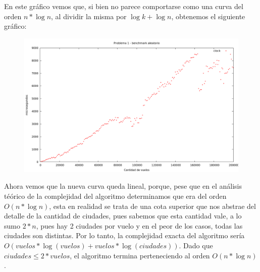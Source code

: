 \vspace*{0.5cm}

En este gráfico vemos que, si bien no parece comportarse como una curva del orden $n*\log n$, al dividir la misma por $\log k + \log n$, obtenemos el siguiente gráfico:

\vspace*{0.5cm}

\begin{figure}[h]
  \begin{center}
    \includegraphics[scale=0.35]{imagenes/grafico-1-v-ajustado.png}
  \end{center}
\end{figure}

\vspace*{0.5cm}

Ahora vemos que la nueva curva queda lineal, porque, pese que en el análisis téórico de la complejidad del algoritmo determinamos que era del orden $O(n*\log n)$, esta en realidad se trata de una cota superior que nos abstrae del detalle de la cantidad de ciudades, pues sabemos que esta cantidad vale, a lo sumo $2*n$, pues hay 2 ciudades por vuelo y en el peor de los casos, todas las ciudades son distintas. Por lo tanto, la complejidad exacta del algoritmo sería $O(vuelos*\log(vuelos) + vuelos*\log(ciudades))$. Dado que               $ciudades \leq 2*vuelos$, el algoritmo termina perteneciendo al orden $O(n*\log n)$.
